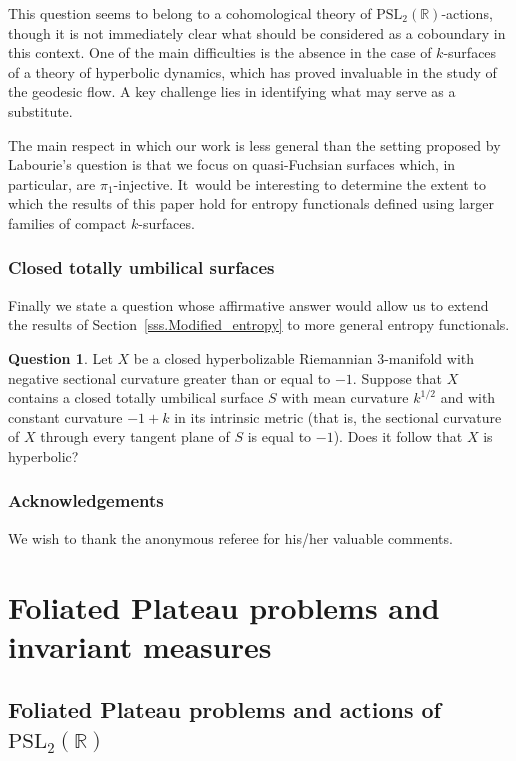\documentclass[11pt]{article}
\newcommand{\Subsection}{\subsection}
\newcommand{\ksurfaces}{$k$\nobreakdash-surfaces\xspace}
\theoremstyle{plain}
\theoremstyle{definition}
\newtheorem{question}[theorem]{Question}
\newcommand\PSL{\mathrm{PSL}_2(\mathbb{R})}
\begin{document}
This question seems to belong to a cohomological theory of $\PSL$-actions, though it is not immediately clear what should be considered as a coboundary in this context. One of the main difficulties is the absence in the case of \ksurfaces of a theory of hyperbolic dynamics, which has proved invaluable in the study of the geodesic flow. A key challenge lies in identifying what may serve as a substitute.

The main respect in which our work is less general than the setting proposed by Labourie's question is that we focus on quasi-Fuchsian surfaces which, in particular, are $\pi_1$-injective. It~would be interesting to determine the extent to which the results of this paper hold for entropy functionals defined using larger families of compact \ksurfaces.

\subsubsection{Closed totally umbilical surfaces}

Finally we state a question whose affirmative answer would allow us to extend the results of Section~\ref{sss.Modified_entropy} to more general entropy functionals.

\begin{question} \label{question:intro}
Let $X$ be a closed hyperbolizable Riemannian 3-manifold with negative sectional curvature greater than or equal to $-1$. Suppose that $X$ contains a closed totally umbilical surface $S$ with mean curvature $k^{1/2}$ and with constant curvature $-1+k$ in its intrinsic metric (that is, the sectional curvature of $X$ through every tangent plane of $S$ is equal to $-1$). Does it follow that $X$ is hyperbolic?
\end{question}

\subsubsection*{Acknowledgements}
We wish to thank the anonymous referee for his/her valuable comments.

\section{Foliated Plateau problems and invariant measures}

\Subsection{Foliated Plateau problems and actions of $\PSL$}\label{ss.as_Plateau}
\end{document}
